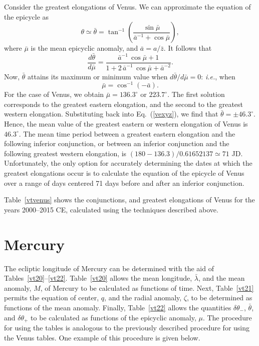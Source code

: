 Consider the greatest elongations of Venus. We can approximate the
equation of the epicycle as
\begin{equation}\label{vexyz}
\theta\simeq \bar{\theta} = \tan^{-1}\left(\frac{\sin \bar{\mu}}{\bar{a}^{-1}+\cos\bar{\mu}}\right),
\end{equation}
where $\bar{\mu}$ is the mean epicyclic anomaly, and $\bar{a}=a/\bar{z}$. 
It follows that
\begin{equation}
\frac{d\bar{\theta}}{d\bar{\mu}} = \frac{\bar{a}^{-1}\,\cos\bar{\mu}+1}
{1 + 2\,\bar{a}^{-1}\,\cos\bar{\mu} + \bar{a}^{-2}}.
\end{equation}
Now, $\bar{\theta}$ attains its maximum or minimum value when
$d\bar{\theta}/d\bar{\mu}=0$: {\em i.e.}, when
\begin{equation}
\bar{\mu} = \cos^{-1}(-\bar{a}).
\end{equation}
For the case of Venus, we obtain $\bar{\mu} = 136.3^\circ$ or $223.7^\circ$. 
The first solution corresponds to the greatest eastern elongation, and the
second to the greatest western elongation. Substituting back into Eq.~(\ref{vexyz}), we find that $\bar{\theta} = \pm 46.3^\circ$.
Hence, the mean value of the greatest eastern or western
elongation of Venus is $46.3^\circ$. The mean time period
between a greatest eastern elongation and the following
inferior conjunction, or between an inferior conjunction and the
following greatest western elongation, is $(180-136.3)/0.61652137\simeq
71$ JD. Unfortunately, the only option for accurately determining the  dates at which the greatest elongations occur is to calculate
the equation of the epicycle of Venus over a range of days centered 71 days  before and after an inferior conjunction.

Table~\ref{vtvenus} shows the conjunctions, and greatest elongations
of Venus for the years 2000--2015 CE, calculated using the
techniques described above.

\section{Mercury}
The ecliptic longitude of Mercury can be determined with the aid of Tables~\ref{vt20}--\ref{vt22}. Table~\ref{vt20} allows
the mean longitude, $\bar{\lambda}$, and the mean anomaly, $M$, of Mercury to be calculated as functions of
time. Next, Table~\ref{vt21} permits the equation of center, $q$, and the radial anomaly, $\zeta$, to
be determined as functions of the mean anomaly. Finally, Table~\ref{vt22} allows the quantities
$\delta\theta_-$, $\bar{\theta}$, and $\delta\theta_+$ to be calculated as functions of the epicyclic
anomaly, $\mu$.  The procedure for using the tables is analogous to the previously described procedure for
using the Venus tables.
One example of this procedure is given below.

